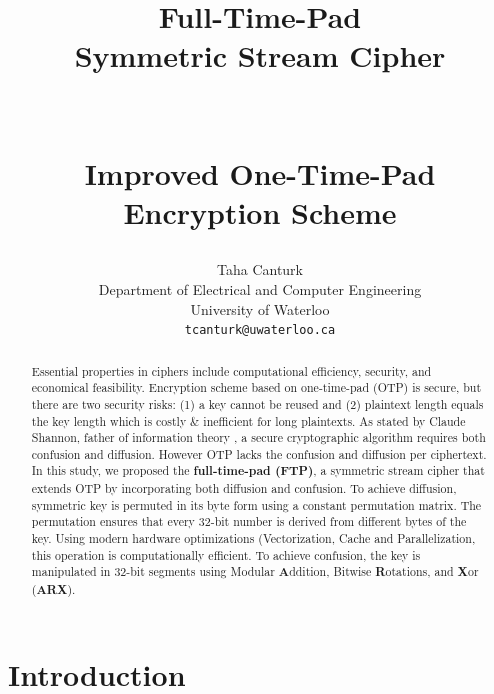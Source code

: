 \documentclass[11pt]{article}
\title {
	\Huge \textbf{Full-Time-Pad\\Symmetric Stream Cipher} \\
	\ \\
	\ \\
	\Large \textbf{Improved One-Time-Pad Encryption Scheme}

}
\author{
Taha Canturk \\
Department of Electrical and Computer Engineering \\
University of Waterloo \\
\texttt{tcanturk@uwaterloo.ca}
}
\date{} %
\theoremstyle{definition}
\theoremstyle{remark}
\begin{document}
\maketitle


\begin{abstract}
	Essential properties in ciphers include computational efficiency, security, and economical feasibility. Encryption scheme based on one-time-pad (OTP) is secure, but there are two security risks: (1) a key cannot be reused and (2) plaintext length equals the key length which is costly \& inefficient for long plaintexts. As stated by Claude Shannon, father of information theory \cite{shannon1945}, a secure cryptographic algorithm requires both confusion and diffusion. However OTP lacks the confusion and diffusion per ciphertext.
	In this study, we proposed the \textbf{full-time-pad (FTP)}, a symmetric stream cipher that extends OTP by incorporating both diffusion and confusion.
	To achieve diffusion, symmetric key is permuted in its byte form using a constant permutation matrix. The permutation ensures that every 32-bit number is derived from different bytes of the key.
	Using modern hardware optimizations (Vectorization, Cache and Parallelization, this operation is computationally efficient.
	To achieve confusion, the key is manipulated in 32-bit segments using Modular \textbf{A}ddition, Bitwise \textbf{R}otations, and \textbf{X}or (\textbf{ARX}).
\end{abstract}
\newpage

\tableofcontents

\newpage


\section{Introduction}
\end{document}
